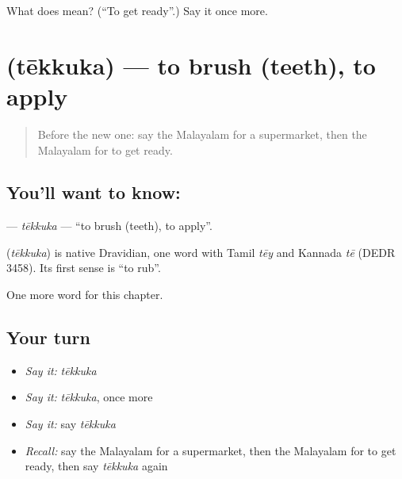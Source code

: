 \begin{tcolorbox}[breakable,colback=teal!4,colframe=teal!35!black,title={Before you move on}]
What does  mean? (\textquotedblleft{}To get ready\textquotedblright{}.) Say it once more.
\end{tcolorbox}
\section[\texorpdfstring{\ml{തേക്കുക} (tēkkuka)}{തേക്കുക (tēkkuka)}]{ (tēkkuka) — to brush (teeth), to apply}

\label{lesson:ML-C264-tekkuka}



\begin{quote}
Before the new one: say the Malayalam for a supermarket, then the Malayalam for to get ready.
\end{quote}

\subsection*{You'll want to know: }
\textbf{} — \emph{tēkkuka} — \textquotedblleft{}to brush (teeth), to apply\textquotedblright{}.

\begin{cousinweb}
\textbf{} (\emph{tēkkuka}) is native Dravidian, one word with Tamil \emph{tēy} and Kannada \emph{tē} (DEDR 3458). Its first sense is \textquotedblleft{}to rub\textquotedblright{}.
\end{cousinweb}

\begin{grammarlens}[title={What you've built}]
One more word for this chapter.
\end{grammarlens}

\subsection*{Your turn}
\begin{itemize}
\raggedright
  \item \emph{Say it:} \emph{tēkkuka}
  \item \emph{Say it:} \emph{tēkkuka}, once more
  \item \emph{Say it:} say \emph{tēkkuka}
  \item \emph{Recall:} say the Malayalam for a supermarket, then the Malayalam for to get ready, then say \emph{tēkkuka} again
\end{itemize}

